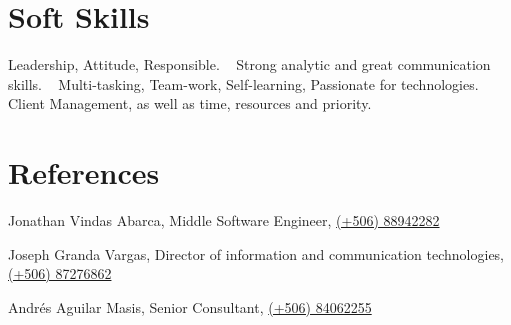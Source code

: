 \documentclass[]{friggeri-cv}
\begin{document}
\section{Soft Skills}
\begin{entrylist}
    \entry
    {}
    {Leadership, Attitude, Responsible.}
    {}
    {}
    ~
    \entry
    {}
    {Strong analytic and great communication skills.}
    {}
    {}
    ~
    \entry
    {}
    {Multi-tasking, Team-work, Self-learning, Passionate for technologies.}
    {}
    {}
    ~
    \entry
    {}
    {Client Management, as well as time, resources and priority.}
    {}
    {}
    ~
    
\end{entrylist}

\section{References}
\begin{entrylist}
  \entry
    {}
    {Jonathan Vindas Abarca, Middle Software Engineer, \href{tel:88942282}{(+506) 88942282}}
    {}
    
    \entry
    {}
    {Joseph Granda Vargas, Director of information and communication technologies, \href{tel:87276862}{(+506) 87276862}}
    {}
    
    \entry
    {}
    {Andrés Aguilar Masis, Senior Consultant, \href{tel:84062255}{(+506) 84062255}}
    {}
    
    
\end{entrylist}

% 
\end{document}
